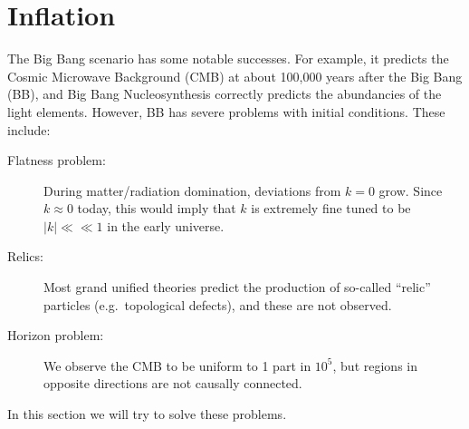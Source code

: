 \documentclass{jknotes}
\begin{document}
\section{Inflation}
The Big Bang scenario has some notable successes. For example, it predicts the Cosmic Microwave Background (CMB) at about 100,000 years after the Big Bang (BB), and Big Bang Nucleosynthesis correctly predicts the abundancies of the light elements. However, BB has severe problems with initial conditions. These include:
\begin{description}
    \item[Flatness problem:] During matter/radiation domination, deviations from \(k=0\) grow. Since \(k\approx 0\) today, this would imply that \(k\) is extremely fine tuned to be \(|k| \ll\!\!\ll 1\) in the early universe.
    \item[Relics:] Most grand unified theories predict the production of so-called ``relic'' particles (e.g.\ topological defects), and these are not observed.
    \item[Horizon problem:] We observe the CMB to be uniform to 1 part in \(10^5\), but regions in opposite directions are not causally connected.
\end{description}
In this section we will try to solve these problems.
\end{document}
